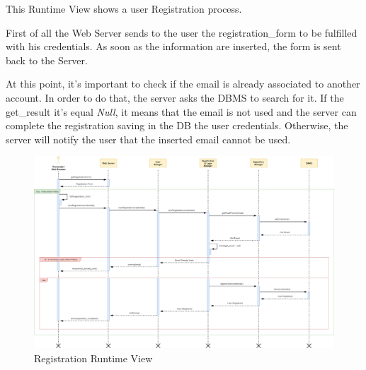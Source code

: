 \newpage
{}
This Runtime View shows a user Registration process.\par
First of all the Web Server sends to the user the registration\_form to be fulfilled with his credentials. As soon as the information are inserted, the form is sent back to the Server.\par
At this point, it’s important to check if the email is already associated to another account. In order to do that, the server asks the DBMS to search for it. If the get\_result it’s equal \emph{Null}, it means that the email is not used and the server can complete the registration saving in the DB the user credentials. Otherwise, the server will notify the user that the inserted email cannot be used.
\begin{figure}[H]
	\centering
	\includegraphics[scale=0.2]{Images/Runtime/Registration}
	\caption{Registration Runtime View}
\end{figure}

